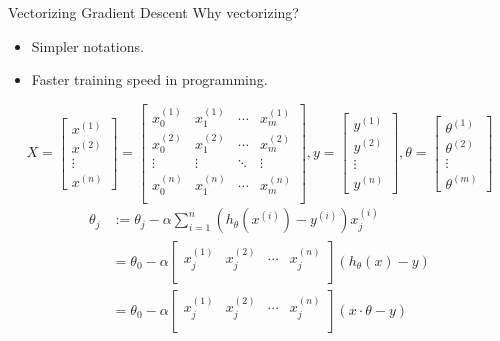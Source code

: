 \documentclass{beamer}
\begin{document}
\begin{frame}{Vectorizing Gradient Descent}
Why vectorizing?
\begin{itemize}
    \item Simpler notations.
    \item Faster training speed in programming.
\end{itemize}

$$
X = \begin{bmatrix}
    x^{(1)}\\x^{(2)}\\\vdots\\x^{(n)}
\end{bmatrix}
=
\begin{bmatrix}
    x_0^{(1)}&x_1^{(1)}&\cdots&x_m^{(1)}\\
    x_0^{(2)}&x_1^{(2)}&\cdots&x_m^{(2)}\\
    \vdots&\vdots&\ddots&\vdots\\
    x_0^{(n)}&x_1^{(n)}&\cdots&x_m^{(n)}\\
\end{bmatrix},
y = \begin{bmatrix}
    y^{(1)}\\y^{(2)}\\\vdots\\y^{(n)}
\end{bmatrix},
\theta = \begin{bmatrix}
    \theta^{(1)}\\\theta^{(2)}\\\vdots\\\theta^{(m)}
\end{bmatrix}
$$
$$
\begin{aligned}
\theta_j &:= \theta_j - \alpha \sum_{i=1}^{n}(h_{\theta}(x^{(i)})-y^{(i)})x_j^{(i)}\\
&= \theta_0 - \alpha \begin{bmatrix}
x_j^{(1)}&x_j^{(2)}&\cdots&x_j^{(n)}\\
\end{bmatrix}
(h_{\theta}(x)-y)\\
&= \theta_0 - \alpha \begin{bmatrix}
x_j^{(1)}&x_j^{(2)}&\cdots&x_j^{(n)}\\
\end{bmatrix}
(x\cdot\theta-y)\\
\end{aligned}
$$
\end{frame}
\end{document}
